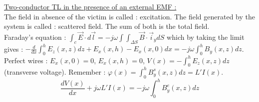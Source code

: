 \documentclass[../main.tex]{subfiles}
\begin{document}
\quad \underline{Two-conductor TL in the presence of an external EMF :}\\
The field in absence of the victim is called : excitation. The field generated by the system is called : scattered field. The sum of both is the total field.\\
Faraday's equation : $\int_c \Vec{E}\cdot d\Vec{l} = -j\omega \int \int_{\Delta S} \Vec{B} \cdot \Vec{i}_y dS$ which by taking the limit gives : $-\frac{d}{dx} \int_0^h E_z(x,z)dz + E_x(x,h)-E_x(x,0)dx = -j\omega \int_0^h  B_y(x,z)dz$. Perfect wires : $E_x(x,0) =0$, $E_x(x,h)=0$, $V(x) = -\int_0^h E_z(x,z)dz$ (transverse voltage). Remember : $\varphi(x) = \int_0^h B_y^s(x,z)dz = L' I(x)$.\\
\begin{equation}
    \frac{dV(x)}{dx} + j\omega L'I(x) = -j\omega \int_0^h B_y^e(x,z)dz
\end{equation}
\end{document}
